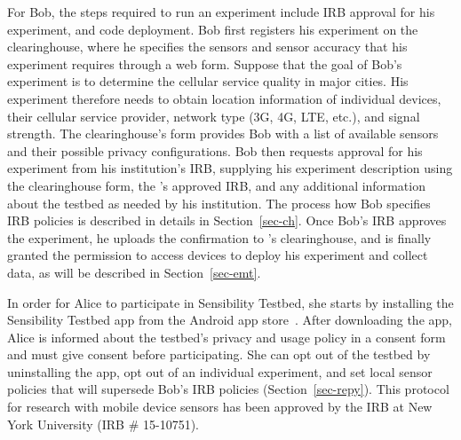 For Bob, the steps required to run an experiment include
IRB approval for his experiment, and code deployment.
Bob first %
registers his experiment on the \sysname clearinghouse, where he 
specifies the sensors and sensor accuracy that his experiment 
requires through a web form. Suppose that the goal of Bob's experiment is to determine the cellular service
quality in major cities. His experiment therefore needs to obtain location information
of individual devices, their cellular service provider, network
type (3G, 4G, LTE, etc.), and signal strength. 
The clearinghouse's form provides Bob 
with a list of available sensors and their possible privacy configurations. 
Bob then requests approval for his experiment from his 
institution's IRB, supplying his experiment description using the clearinghouse form, the \sysname's approved 
IRB, and any additional information about the testbed as needed by his institution. 
The process how Bob specifies IRB policies is described in details in 
Section~\ref{sec-ch}. Once Bob's IRB approves the experiment, he 
uploads the confirmation to \sysname's clearinghouse, and is finally 
granted the permission to access devices to deploy his experiment 
and collect data, as will be described in Section~\ref{sec-emt}.

In order for Alice to participate in Sensibility Testbed,
she starts by installing the Sensibility Testbed app from 
the Android app store~\cite{sensibility-app}. After downloading the app, 
Alice is informed about the testbed's privacy and usage policy 
in a consent form and must give consent before participating.
She can opt out of the testbed by uninstalling the app, opt out of
an individual experiment, and set local sensor policies that
will supersede Bob's IRB policies (Section~\ref{sec-repy}). This
protocol for research with mobile device sensors has been approved by
the IRB at New York University (IRB \# 15-10751).  

